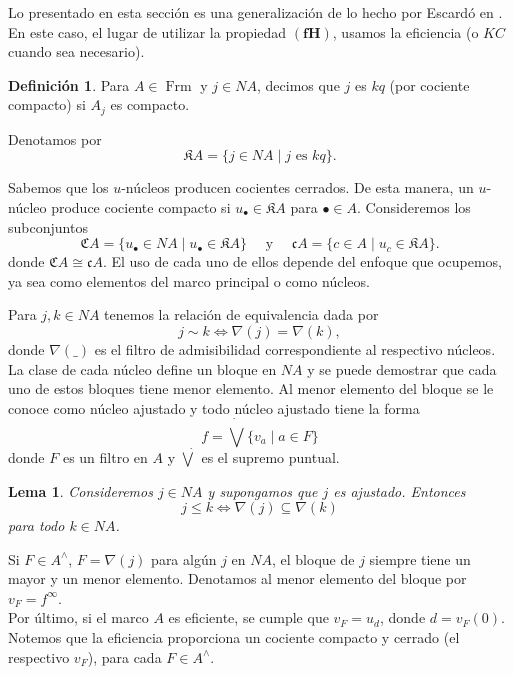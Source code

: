 \documentclass[11pt]{amsart}
\DeclareMathOperator{\Frm}{Frm}
\theoremstyle{plain}
\newtheorem{lem}[thm]{Lema}
\theoremstyle{definition}
\newtheorem{dfn}[thm]{Definición}
\begin{document}
Lo presentado en esta sección es una generalización de lo hecho por Escardó en \cite{escardo2006compactly}. En este caso, el lugar de utilizar la propiedad
$\mathbf{(fH)}$, usamos la eficiencia (o $KC$ cuando sea necesario).

\begin{dfn}\label{Definicion2.1}
Para $A\in \Frm$ y $j\in NA$, decimos que $j$ es $kq$ (por cociente compacto) si $A_j$ es compacto.  
\end{dfn}

Denotamos por 
\[
\mathfrak{K}A=\{j\in NA\mid j \mbox{ es } kq\}.
\]

Sabemos que los $u$-núcleos producen cocientes cerrados. De esta manera, un $u$-núcleo produce cociente compacto si $u_{\bullet}\in \mathfrak{K}A$ para $\bullet\in A$. Consideremos los subconjuntos
\[
\mathfrak{C}A=\{u_\bullet\in NA\mid u_\bullet\in \mathfrak{K}A\}\quad \mbox{ y }\quad \mathfrak{c}A=\{c\in A\mid u_c\in \mathfrak{K}A\}.
\]
donde $\mathfrak{C}A\cong \mathfrak{c}A$. El uso de cada uno de ellos depende del enfoque que ocupemos, ya sea como elementos del marco principal o como núcleos.

Para $j, k\in NA$ tenemos la relación de equivalencia dada por 
\[
j\sim k \Leftrightarrow \nabla(j)=\nabla(k),
\]
donde $\nabla( \_ )$ es el filtro de admisibilidad correspondiente al respectivo núcleos.\\

La clase de cada núcleo define un bloque en $NA$ y se puede demostrar que cada uno de estos bloques tiene menor elemento. Al menor elemento del bloque se le conoce como núcleo ajustado y todo núcleo ajustado tiene la forma
\[
f=\dot\bigvee \{v_a\mid a\in F\}
\]
donde $F$ es un filtro en $A$ y $\dot{\bigvee}$ es el supremo puntual.

\begin{lem}\label{cn ajustado}
    Consideremos $j\in NA$ y supongamos que $j$ es ajustado. Entonces
    \[
    j\leq k\Leftrightarrow \nabla(j)\subseteq \nabla(k)
    \]
    para todo $k\in NA$.
\end{lem}

Si $F\in A^\wedge$, $F=\nabla(j)$ para algún $j$ en $NA$, el bloque de $j$ siempre tiene un mayor y un menor elemento. Denotamos al menor elemento del bloque por  $v_F=f^\infty$.\\

Por último, si el marco $A$ es eficiente, se cumple que $v_F=u_d$, donde $d=v_F(0)$. Notemos que la eficiencia proporciona un cociente compacto y cerrado (el respectivo $v_F$), 
para cada $F\in A^\wedge$.\\
\end{document}
